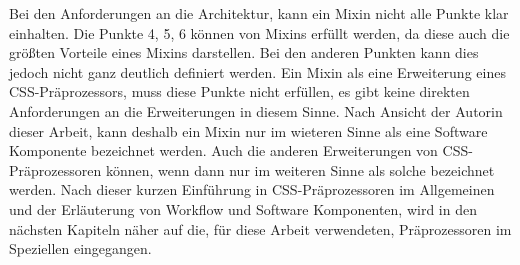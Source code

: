 Bei den Anforderungen an die Architektur, kann ein Mixin nicht alle Punkte klar einhalten. Die Punkte 4, 5, 6 können von Mixins erfüllt werden, da diese auch die größten Vorteile eines Mixins darstellen. Bei den anderen Punkten kann dies jedoch nicht ganz deutlich definiert werden. \newline
Ein Mixin als eine Erweiterung eines CSS-Präprozessors, muss diese Punkte nicht erfüllen, es gibt keine direkten Anforderungen an die Erweiterungen in diesem Sinne.\newline
Nach Ansicht der Autorin dieser Arbeit, kann deshalb ein Mixin nur im wieteren Sinne als eine Software Komponente bezeichnet werden. Auch die anderen Erweiterungen von CSS-Präprozessoren können, wenn dann nur im weiteren Sinne als solche bezeichnet werden.\newline\newline
Nach dieser kurzen Einführung in CSS-Präprozessoren im Allgemeinen und der Erläuterung von Workflow und Software Komponenten, wird in den nächsten Kapiteln näher auf die, für diese Arbeit verwendeten, Präprozessoren im Speziellen eingegangen.
\newpage
